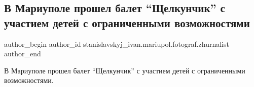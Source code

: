  
 
 
 
 

\subsection{В Мариуполе прошел балет \enquote{Щелкунчик} с участием детей с ограниченными возможностями}
\label{sec:25_12_2018.fb.stanislavskyj_ivan.mariupol.fotograf.zhurnalist.1.schelkunchik_balet_deti}

\ifcmt
 author_begin
   author_id stanislavskyj_ivan.mariupol.fotograf.zhurnalist
 author_end
\fi

В Мариуполе прошел балет \enquote{Щелкунчик} с участием детей с ограниченными возможностями.

